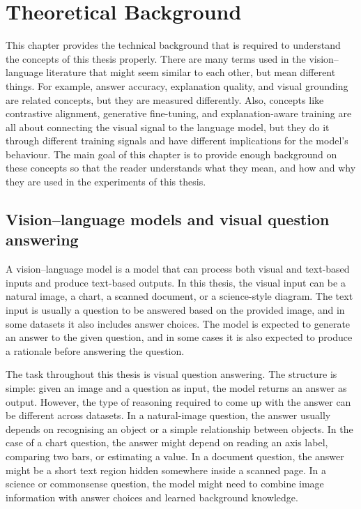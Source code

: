 \documentclass[12pt,bibliography=totoc,listof=totoc,BCOR=5mm,DIV=12,oneside,open=any]{scrbook}
\begin{document}
\chapter{Theoretical Background}
This chapter provides the technical background that is required to understand the concepts of this thesis properly.
There are many terms used in the vision--language literature that might seem similar to each other, but mean different things.
For example, answer accuracy, explanation quality, and visual grounding are related concepts, but they are measured differently.
Also, concepts like contrastive alignment, generative fine-tuning, and explanation-aware training are all about connecting the visual signal to the language model,
but they do it through different training signals and have different implications for the model's behaviour.
The main goal of this chapter is to provide enough background on these concepts so that the reader understands
what they mean, and how and why they are used in the experiments of this thesis.

\section{Vision--language models and visual question answering}
A vision--language model is a model that can process both visual and text-based inputs and produce text-based outputs.
In this thesis, the visual input can be a natural image, a chart, a scanned document, or a science-style diagram.
The text input is usually a question to be answered based on the provided image, and in some datasets it also includes answer choices.
The model is expected to generate an answer to the given question, and in some cases it is also expected to produce a rationale before answering the question.

The task throughout this thesis is visual question answering.
The structure is simple: given an image and a question as input, the model returns an answer as output.
However, the type of reasoning required to come up with the answer can be different across datasets.
In a natural-image question, the answer usually depends on recognising an object or a simple relationship between objects.
In the case of a chart question, the answer might depend on reading an axis label, comparing two bars, or estimating a value.
In a document question, the answer might be a short text region hidden somewhere inside a scanned page.
In a science or commonsense question, the model might need to combine image information with answer choices and learned background knowledge.
\end{document}

